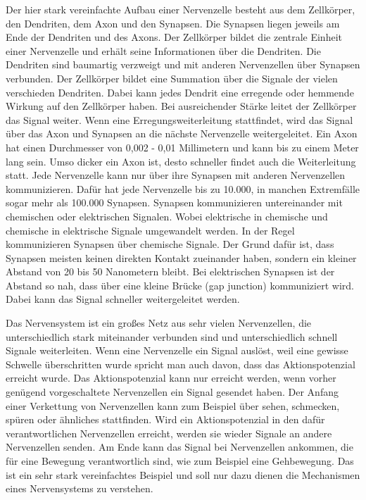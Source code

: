 Der hier stark vereinfachte Aufbau einer Nervenzelle besteht aus dem Zellkörper, den Dendriten, dem Axon und den Synapsen. Die Synapsen liegen jeweils am Ende der Dendriten und des Axons. Der Zellkörper bildet die zentrale Einheit einer Nervenzelle und erhält seine Informationen über die Dendriten. Die Dendriten sind baumartig verzweigt und mit anderen Nervenzellen über Synapsen verbunden. Der Zellkörper bildet eine Summation über die Signale der vielen verschieden Dendriten. Dabei kann jedes Dendrit eine erregende oder hemmende Wirkung auf den Zellkörper haben. Bei ausreichender Stärke leitet der Zellkörper das Signal weiter. Wenn eine Erregungsweiterleitung stattfindet, wird das Signal über das Axon und Synapsen an die nächste Nervenzelle weitergeleitet. Ein Axon hat einen Durchmesser von 0,002 - 0,01 Millimetern und kann bis zu einem Meter lang sein.\cite{gehirnlernen.de} Umso dicker ein Axon ist, desto schneller findet auch die Weiterleitung statt. Jede Nervenzelle kann nur über ihre Synapsen mit anderen Nervenzellen kommunizieren. Dafür hat jede Nervenzelle bis zu 10.000, in manchen Extremfälle sogar mehr als 100.000 Synapsen.\cite{dasgehirn.info} Synapsen kommunizieren untereinander mit chemischen oder elektrischen Signalen. Wobei elektrische in chemische und chemische in elektrische Signale umgewandelt werden. In der Regel kommunizieren Synapsen über chemische Signale. Der Grund dafür ist, dass Synapsen meisten keinen direkten Kontakt zueinander haben, sondern ein kleiner Abstand von 20 bis 50 Nanometern bleibt.\cite{dasgehirn.info} Bei elektrischen Synapsen ist der Abstand so nah, dass über eine kleine Brücke (gap junction) kommuniziert wird. Dabei kann das Signal schneller weitergeleitet werden.\cite{gehirnlernen.de}

Das Nervensystem ist ein großes Netz aus sehr vielen Nervenzellen, die unterschiedlich stark miteinander verbunden sind und unterschiedlich schnell Signale weiterleiten. Wenn eine Nervenzelle ein Signal auslöst, weil eine gewisse Schwelle überschritten wurde spricht man auch davon, dass das Aktionspotenzial erreicht wurde. Das Aktionspotenzial kann nur erreicht werden, wenn vorher genügend vorgeschaltete Nervenzellen ein Signal gesendet haben. Der Anfang einer Verkettung von Nervenzellen kann zum Beispiel über sehen, schmecken, spüren oder ähnliches stattfinden. Wird ein Aktionspotenzial in den dafür verantwortlichen Nervenzellen erreicht, werden sie wieder Signale an andere Nervenzellen senden. Am Ende kann das Signal bei Nervenzellen ankommen, die für eine Bewegung verantwortlich sind, wie zum Beispiel eine Gehbewegung. Das ist ein sehr stark vereinfachtes Beispiel und soll nur dazu dienen die Mechanismen eines Nervensystems zu verstehen.

